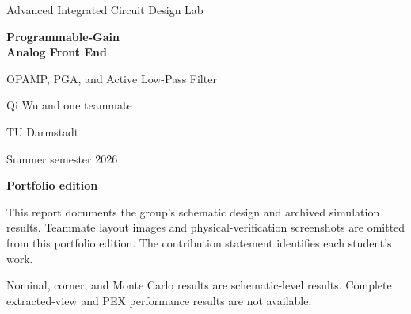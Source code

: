 \documentclass[a4paper,11pt]{report}
\begin{document}
\begin{titlepage}
\raggedright
\vspace*{24mm}
{\large Advanced Integrated Circuit Design Lab\par}
\vspace{12mm}
{\Huge\bfseries Programmable-Gain\\[3mm]Analog Front End\par}
\vspace{8mm}
{\Large OPAMP, PGA, and Active Low-Pass Filter\par}
\vspace{16mm}
{\large Qi Wu and one teammate\par}
TU Darmstadt\par
Summer semester 2026\par
\vfill
\textbf{Portfolio edition}\par
This report documents the group's schematic design and archived simulation results. Teammate layout images and physical-verification screenshots are omitted from this portfolio edition. The contribution statement identifies each student's work.\par
Nominal, corner, and Monte Carlo results are schematic-level results. Complete extracted-view and PEX performance results are not available.\par
\end{titlepage}

\tableofcontents






\appendix

\begingroup
\small
\listoffigures
\listoftables
\endgroup
\end{document}
